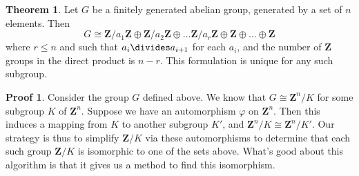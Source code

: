 \documentclass[12pt]{amsbook}
\theoremstyle{definition}
\newtheorem{theorem}{Theorem}[chapter]
\newtheorem*{prf}{Proof}
\newcommand{\bint}{\mathbf{Z}} %
\begin{document}
\begin{theorem}
    Let $G$ be a finitely generated abelian group, generated by a set of $n$ elements. Then
    \[ G \cong \bint/a_1\bint \oplus \bint/a_2\bint \oplus \dots \bint/a_r\bint \oplus \bint \oplus \dots \oplus \bint \]
    where $r \leq n$ and such that $a_i \divides a_{i+1}$ for each $a_i$, and the number of $\bint$ groups in the direct product is $n - r$. This formulation is unique for any such subgroup.
\end{theorem}
\begin{prf}
    Consider the group $G$ defined above. We know that $G \cong \bint^n/K$ for some subgroup $K$ of $\bint^n$. Suppose we have an automorphism $\varphi$ on $\bint^n$. Then this induces a mapping from $K$ to another subgroup $K'$, and $\bint^n/K \cong \bint^n/K'$. Our strategy is thus to simplify $\bint/K$ via these automorphisms to determine that each such group $\bint/K$ is isomorphic to one of the sets above. What's good about this algorithm is that it gives us a method to find this isomorphism.


\end{prf}
\end{document}
